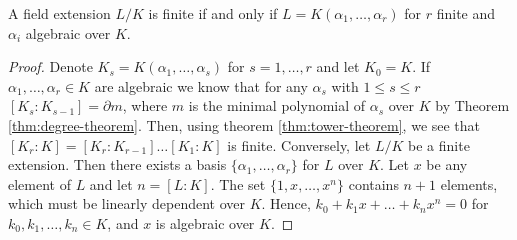 %


\begin{theorem} \label{thm:finite-equi-def}
    A field extension $L/K$ is finite if and only if $L = K(\alpha_1, \dots, \alpha_r)$ for $r$ finite and $\alpha_i$ algebraic over $K$. 
\end{theorem}

\begin{proof}
    Denote $K_s = K(\alpha_1, \dots, \alpha_s)$ for $s = 1, \dots, r$ and let $K_0 = K$. If \(\alpha_1, \dots , \alpha_r \in K\) are algebraic we know that for any \(\alpha_s\) with \(1 \leq s \leq r\) \( [K_s: K_{s-1}] = \partial m\), where \(m\) is the minimal polynomial of \(\alpha_s\) over \(K\) by Theorem \ref{thm:degree-theorem}. Then, using theorem \ref{thm:tower-theorem}, we see that \([K_r : K] = [K_r:K_{r-1}]\dots[K_1:K]\) is finite. Conversely, let \(L/K\) be a finite extension. Then there exists a basis \(\{\alpha_1, \dots, \alpha_r\}\) for \(L\) over \(K\). Let \(x\) be any element of \(L\) and let \(n = [L:K]\). The set \(\{1,x,\dots,x^n\}\) contains \(n+1\) elements, which must be linearly dependent over \(K\). Hence, \(k_0 + k_1 x + \dots + k_n x^n = 0\) for \(k_0, k_1, \dots, k_n \in K\), and \(x\) is algebraic over \(K\).
\end{proof}



